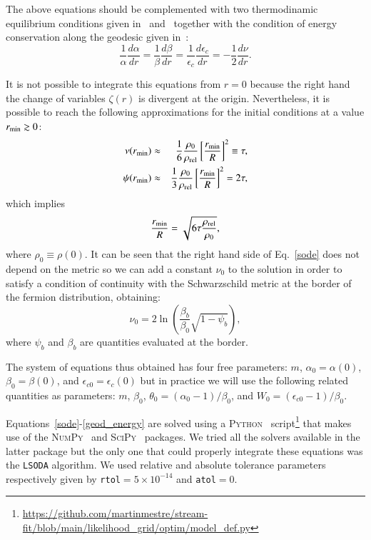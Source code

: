 \documentclass[twocolumn]{aa}
\begin{document}
The above equations should be complemented with two thermodinamic equilibrium conditions given
in~\citet{PhysRev.35.904} and~\citet{RevModPhys.21.531} together with the condition of energy conservation
along the geodesic given in~\citet{1989A&A...221....4M}:
\begin{equation}
   \frac{1}{\alpha}\frac{d\alpha}{dr}=\frac{1}{\beta}\frac{d\beta}{dr}=
   \frac{1}{\epsilon_c}\frac{d\epsilon_c}{dr}=-\frac{1}{2}\frac{d\nu}{dr}.
   \label{geod_energy}
\end{equation}

It is not possible to integrate this equations from $r=0$ because the right hand the change of variables $\zeta(r)$ is divergent at the origin. Nevertheless, it is possible
to reach the following approximations for the initial conditions at a value $r_{\rm{min}}\gtrsim 0$:
\begin{eqnarray}
   \nu(r_{\rm{min}}) &\approx& \frac{1}{6}\frac{\rho_0}{\rho_{\rm{rel}}}\left[\frac{r_{\rm{min}}}{R}\right]^2\equiv\tau, \\
   \psi(r_{\rm{min}})&\approx&\frac{1}{3}\frac{\rho_0}{\rho_{\rm{rel}}}\left[\frac{r_{\rm{min}}}{R}\right]^2=2\tau,
\end{eqnarray}
which implies
\begin{equation}
   \frac{r_{\rm{min}}}{R}=\sqrt{6\tau\frac{\rho_{\rm{rel}}}{\rho_0}},
\end{equation}
where $\rho_0\equiv \rho(0)$.
It can be seen that the right hand side of Eq.~\ref{sode} does not depend on the metric so we can add
a constant $\nu_0$ to the solution in order to satisfy a condition of continuity with the Schwarzschild metric at the border of the fermion distribution, obtaining:
$$\nu_0 = 2\ln\left(\frac{\beta_b}{\beta_0}\sqrt{1-\psi_b}\right),$$
where $\psi_b$ and $\beta_b$ are quantities evaluated at the border.

The system of equations thus obtained has four free parameters: $m$, $\alpha_0=\alpha(0)$,
$\beta_0=\beta(0)$, and $\epsilon_{c0}=\epsilon_c(0)$ but in practice we will use the following related
quantities as parameters:
$m$, $\beta_0$, $\theta_0=(\alpha_0-1)/\beta_0$, and $W_0=(\epsilon_{c0}-1)/\beta_0$.

Equations~\ref{sode}-\ref{geod_energy} are solved using
a {\scshape{Python}}~\citep{van1995python} script\footnote{
\url{https://github.com/martinmestre/stream-fit/blob/main/likelihood_grid/optim/model_def.py}
}
that makes use of the {\scshape{NumPy}}~\citep{2020SciPy-NMeth} and {\scshape{SciPy}}~\citep{harris2020array} packages. We tried all the solvers available in the latter package but the only one that
could properly integrate these equations was the \texttt{LSODA} algorithm. We used relative and absolute tolerance parameters respectively given by \texttt{rtol}$=5\times10^{-14}$ and \texttt{atol}$=0$.
\end{document}
